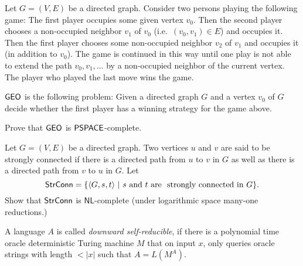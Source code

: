 \documentclass[12pt,a4, onecolumn]{exam}
\newcommand{\NL}{\ensuremath{\mathsf{NL}}}
\begin{document}
\begin{questions}
    \begin{solution}
        
    \end{solution}

    \question Let $G=(V,E)$ be a directed graph. Consider two persons playing the
    following game: The first player occupies some given vertex $v_0$.
    Then the second player chooses a non-occupied neighbor $v_1$ of
    $v_0$ (i.e.\ $(v_0, v_1)\in E$) and occupies it. Then the first
    player chooses some non-occupied neighbor $v_2$ of $v_1$ and
    occupies it (in addition to $v_0$). The game is continued in this
    way until one play is not able to extend the path $v_0, v_1, \ldots$
    by a non-occupied neighbor of the current vertex. The player who
    played the last move wins the game.
    
    ${\sf GEO}$ is the following problem: Given a directed graph $G$ and a
    vertex $v_0$ of $G$ decide whether the first player has a winning
    strategy for the game above.
    
    Prove that ${\sf GEO}$ is ${\sf PSPACE}$-complete.

    \begin{solution}
        
    \end{solution}

    \question Let $G=(V,E)$ be a directed graph. Two vertices $u$ and $v$ are said to be strongly connected if there is a directed  path from $u$ to $v$ in $G$ as well as there is a directed path from $v$ to $u$ in $G$. Let \[ {\sf StrConn} = \{\langle G, s,t \rangle\ |\ s \text{ and } t \text{ are}  \ \text{ strongly connected in }G\}.\] Show that ${\sf StrConn}$ is $\NL$-complete (under logarithmic space many-one reductions.)
  
    \begin{solution}
        
    \end{solution}

    \question A language $A$ is called \emph{downward self-reducible}, if there is a polynomial time oracle deterministic Turing machine $M$ that on input $x$, only queries oracle strings with length $< |x|$ such that $A = L(M^A)$.

    \begin{solution}
        
    \end{solution}
\end{questions}
\end{document}
